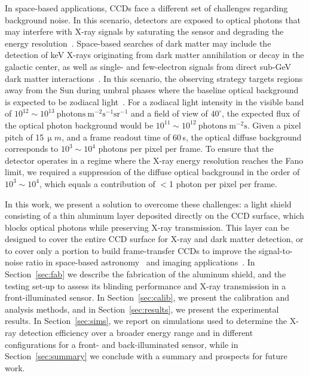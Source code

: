 \documentclass[twocolumn]{aastex631}
\begin{document}
In space-based applications, CCDs face a different set of challenges regarding background noise. In this scenario, detectors are exposed to optical photons that may interfere with X-ray signals by saturating the sensor and degrading the energy resolution~\cite{Chandra}. Space-based searches of dark matter may include the detection of keV X-rays originating from dark matter annihilation or decay in the galactic center, as well as single- and few-electron signals from direct sub-GeV dark matter interactions~\cite{ALPINE20254793}. In this scenario, the observing strategy targets regions away from the Sun during umbral phases where the baseline optical background is expected to be zodiacal light~\cite{Leinert}. For a zodiacal light intensity in the visible band of $ 10^{12}\sim10^{13}\ \mathrm{photons}\ \mathrm{m}^{-2}\mathrm{s}^{-1}\mathrm{sr}^{-1}$ and a field of view of $40^\circ$, the expected flux of the optical photon background would be $10^{11}\sim10^{12}\ \mathrm{photons}\ \mathrm{m}^{-2}\mathrm{s}$. Given a pixel pitch of 15\,$\upmu m$, and a frame readout time of 60\,s, the optical diffuse background corresponds to $10^{3}\sim10^{4}$ photons per pixel per frame. To ensure that the detector operates in a regime where the X-ray energy resolution reaches the Fano limit, we required a suppression of the diffuse optical background in the order of $10^{3}\sim10^{4}$, which equals a contribution of $<$1 photon per pixel per frame.  


In this work, we present a solution to overcome these challenges: a light shield consisting of a thin aluminum layer deposited directly on the CCD surface, which blocks optical photons while preserving X-ray transmission. This layer can be designed to cover the entire CCD surface for X-ray and dark matter detection, or to cover only a portion to build frame-transfer CCDs to improve the signal-to-noise ratio in space-based astronomy~\cite{tindall, XRISM1, XRISM2, rexis} and imaging applications~\cite{Sierks2011}. In Section~\ref{sec:fab} we describe the fabrication of the aluminum shield, and the testing set-up to assess its blinding performance and X-ray transmission in a front-illuminated sensor. In Section~\ref{sec:calib}, we present the calibration and analysis methods, and in Section~\ref{sec:results}, we present the experimental results. In Section~\ref{sec:sims}, we report on simulations used to determine the X-ray detection efficiency over a broader energy range and in different configurations for a front- and back-illuminated sensor, while in Section~\ref{sec:summary} we conclude with a summary and prospects for future work.
\end{document}
